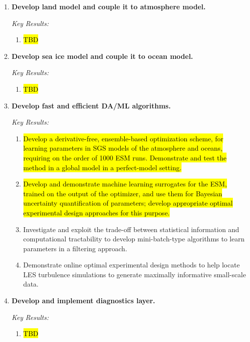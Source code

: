\documentclass{article}
\newcommand{\hlg}[1]{{\sethlcolor{green}\hl{#1}}}
\begin{document}
\begin{enumerate}
\item \textbf{Develop land model and couple it to atmosphere model.}

   \emph{Key Results:}
     \begin{enumerate}
        \item \hl{TBD}
      \end{enumerate}
      
      \item \textbf{Develop sea ice model and couple it to ocean model.}

   \emph{Key Results:}
     \begin{enumerate}
        \item \hl{TBD}
      \end{enumerate}
    
    \item \textbf{Develop fast and efficient DA/ML algorithms.}
    
    \emph{Key Results:}
     \begin{enumerate}
        \item \hlg{Develop a derivative-free, ensemble-based optimization scheme, for learning parameters in SGS models of the atmosphere and oceans, requiring on the order of 1000 ESM runs. Demonstrate and test the method in a global model in a perfect-model setting.}
        \item \hlg{Develop and demonstrate machine learning surrogates for the ESM, trained on the output of the optimizer, and use them for Bayesian uncertainty quantification of parameters; develop appropriate optimal experimental design approaches for this purpose.}
        \item Investigate and exploit the trade-off between statistical information and computational tractability to develop mini-batch-type algorithms to learn parameters in a filtering approach.
        \item Demonstrate online optimal experimental design methods to help locate LES turbulence simulations to generate maximally informative small-scale data.
    \end{enumerate}

\item \textbf{Develop and implement diagnostics layer.}
    
    \emph{Key Results:}
     \begin{enumerate}
        \item \hl{TBD}
        \end{enumerate}
        

\end{enumerate}
\end{document}
